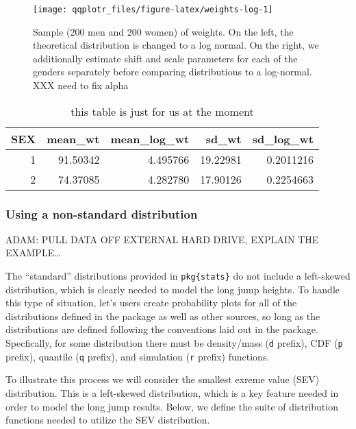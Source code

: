 \begin{Schunk}
\begin{figure}

{\centering \texttt{[image: qqplotr\_files/figure-latex/weights-log-1]} 

}

\caption[Sample (200 men and 200 women) of weights]{Sample (200 men and 200 women) of weights. On the left, the theoretical distribution  is changed to a log normal. On the right, we additionally estimate shift and scale parameters for each of the genders separately before comparing distributions to a log-normal. XXX need to fix alpha}\label{fig:weights-log}
\end{figure}
\end{Schunk}

\begin{table}

\caption{\label{tab:table}this table is just for us at the moment}
\centering
\begin{tabular}[t]{r|r|r|r|r}
\hline
SEX & mean\_wt & mean\_log\_wt & sd\_wt & sd\_log\_wt\\
\hline
1 & 91.50342 & 4.495766 & 19.22981 & 0.2011216\\
\hline
2 & 74.37085 & 4.282780 & 17.90126 & 0.2254663\\
\hline
\end{tabular}
\end{table}

\subsubsection{Using a non-standard
distribution}\label{using-a-non-standard-distribution}

ADAM: PULL DATA OFF EXTERNAL HARD DRIVE, EXPLAIN THE EXAMPLE\ldots{}

The ``standard'' distributions provided in \texttt{pkg\{stats\}} do not
include a left-skewed distribution, which is clearly needed to model the
long jump heights. To handle this type of situation,  let's
users create probability plots for all of the distributions defined in
the  package as well as other sources, so long as the
distributions are defined following the conventions laid out in the
 package. Specfically, for some distribution there must be
density/mass (\texttt{d} prefix), CDF (\texttt{p} prefix), quantile
(\texttt{q} prefix), and simulation (\texttt{r} prefix) functions.

To illustrate this process we will consider the smallest exreme value
(SEV) distribution. This is a left-skewed distribution, which is a key
feature needed in order to model the long jump results. Below, we define
the suite of distribution functions needed to utilize the SEV
distribution.

